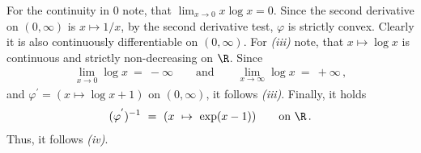 \begin{example}
For the continuity in $0$ note, that $\lim_{x\to 0} x\log x=0$. 
Since the second derivative on $(0,\infty)$ is $x\mapsto 1/x$, by the second derivative test, $\varphi$ is strictly convex.
Clearly it is also continuously differentiable on $(0,\infty)$.
For \textit{(iii)} note, that $x\mapsto \log x$ is continuous and strictly non-decreasing on $\R$. 
Since 
\begin{align*}
  \lim_{x\to 0}\log x\ =\ -\infty
  \qquad
  \text{and}
  \qquad
  \lim_{x\to \infty}\log x\ =\ +\infty
  \,,
\end{align*}
and $\varphi^{'}=(x\mapsto \log x +1)$ on $(0,\infty)$, it follows \textit{(iii)}. 
Finally, it holds 
\begin{align*}
(\varphi^{'})^{-1}
\ 
=
\ 
(x\ \mapsto \ \exp(x-1))
\qquad
\text{on}\ \R
\,.
\end{align*}
Thus, it follows \textit{(iv)}.
\end{example}
